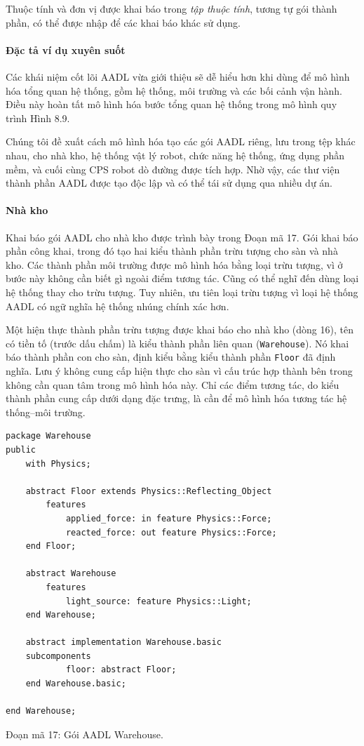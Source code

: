 Thuộc tính và đơn vị được khai báo trong \emph{tập thuộc tính}, tương tự gói thành phần, có thể được nhập để các khai báo khác sử dụng.

\paragraph*{Đặc tả ví dụ xuyên suốt}
Các khái niệm cốt lõi AADL vừa giới thiệu sẽ dễ hiểu hơn khi dùng để mô hình hóa tổng quan hệ thống, gồm hệ thống, môi trường và các bối cảnh vận hành. Điều này hoàn tất mô hình hóa bước tổng quan hệ thống trong mô hình quy trình Hình 8.9.

Chúng tôi đề xuất cách mô hình hóa tạo các gói AADL riêng, lưu trong tệp khác nhau, cho nhà kho, hệ thống vật lý robot, chức năng hệ thống, ứng dụng phần mềm, và cuối cùng CPS robot dò đường được tích hợp. Nhờ vậy, các thư viện thành phần AADL được tạo độc lập và có thể tái sử dụng qua nhiều dự án.

\paragraph*{Nhà kho}
Khai báo gói AADL cho nhà kho được trình bày trong Đoạn mã 17. Gói khai báo phần công khai, trong đó tạo hai kiểu thành phần trừu tượng cho sàn và nhà kho. Các thành phần môi trường được mô hình hóa bằng loại trừu tượng, vì ở bước này không cần biết gì ngoài điểm tương tác. Cũng có thể nghĩ đến dùng loại hệ thống thay cho trừu tượng. Tuy nhiên, ưu tiên loại trừu tượng vì loại hệ thống AADL có ngữ nghĩa hệ thống nhúng chính xác hơn.

Một hiện thực thành phần trừu tượng được khai báo cho nhà kho (dòng 16), tên có tiền tố (trước dấu chấm) là kiểu thành phần liên quan (\texttt{Warehouse}). Nó khai báo thành phần con cho sàn, định kiểu bằng kiểu thành phần \texttt{Floor} đã định nghĩa. Lưu ý không cung cấp hiện thực cho sàn vì cấu trúc hợp thành bên trong không cần quan tâm trong mô hình hóa này. Chỉ các điểm tương tác, do kiểu thành phần cung cấp dưới dạng đặc trưng, là cần để mô hình hóa tương tác hệ thống--môi trường.
\begin{verbatim}
package Warehouse
public
    with Physics;

    abstract Floor extends Physics::Reflecting_Object
        features
            applied_force: in feature Physics::Force;
            reacted_force: out feature Physics::Force;
    end Floor;

    abstract Warehouse
        features
            light_source: feature Physics::Light;
    end Warehouse;

    abstract implementation Warehouse.basic
    subcomponents
            floor: abstract Floor;
    end Warehouse.basic;

end Warehouse;
\end{verbatim}
\begin{center}\small Đoạn mã 17: Gói AADL Warehouse.\end{center}

